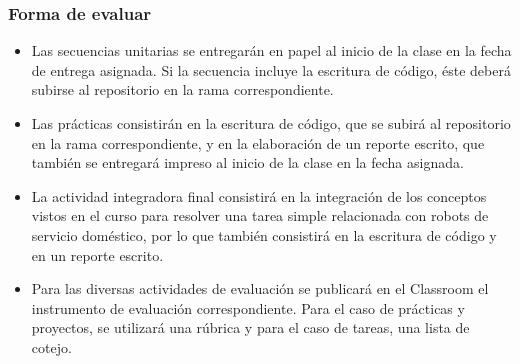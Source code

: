 \begin{frame}\frametitle{Forma de evaluar}
  \begin{itemize}
  \item Las secuencias unitarias se entregarán en papel al inicio de la clase en la fecha de entrega asignada. Si la secuencia incluye la escritura de código, éste deberá subirse al repositorio en la rama correspondiente. 
  \item Las prácticas consistirán en la escritura de código, que se subirá al repositorio en la rama correspondiente, y en la elaboración de un reporte escrito, que también se entregará impreso al inicio de la clase en la fecha asignada. 
  \item La actividad integradora final consistirá en la integración de los conceptos vistos en el curso para resolver una tarea simple relacionada con robots de servicio doméstico, por lo que también consistirá en la escritura de código y en un reporte escrito.
  \item Para las diversas actividades de evaluación se publicará en el Classroom el instrumento de evaluación correspondiente. Para el caso de prácticas y proyectos, se utilizará una rúbrica y para el caso de tareas, una lista de cotejo. 
  \end{itemize}
\end{frame}

